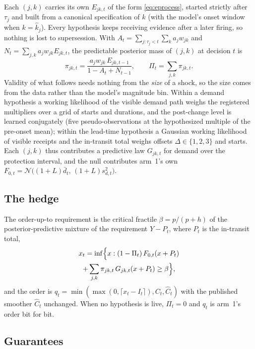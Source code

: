 Each $(j,k)$ carries its own \eprocess{} $E_{jk,t}$ of the form
\eqref{eq:eprocess}, started strictly after $\tau_j$ and built from a canonical
specification of $k$ (with the model's onset window when $k = \hat k_j$). Every
hypothesis keeps receiving evidence after a later firing, so nothing is lost to
supersession. With $A_t = \sum_{j:\tau_j < t}\sum_k a_j w_{jk}$ and
$N_t = \sum_{j,k} a_j w_{jk} E_{jk,t}$, the predictable posterior mass of $(j,k)$
at decision $t$ is
\begin{equation}
\pi_{jk,t} = \frac{a_j w_{jk}\, E_{jk,t-1}}{1 - A_t + N_{t-1}},
\qquad
\Pi_t = \sum_{j,k} \pi_{jk,t}.
\label{eq:posterior}
\end{equation}
Validity of what follows needs nothing from the \emph{size} of a shock, so the
size comes from the data rather than the model's magnitude bin. Within a demand
hypothesis a working likelihood of the visible demand path weighs the registered
multipliers over a grid of starts and durations, and the post-change level is
learned conjugately (five pseudo-observations at the hypothesized multiple of the
pre-onset mean); within the lead-time hypothesis a Gaussian working likelihood of
visible receipts and the in-transit total weighs offsets $\Delta \in \{1,2,3\}$
and starts. Each $(j,k)$ thus contributes a predictive law $G_{jk,t}$ for demand
over the protection interval, and the null contributes arm~1's own
$F_{0,t} = \mathcal{N}\bigl((1+L)\bar d_t,\,(1+L)s_{d,t}^2\bigr)$.

\subsection{The hedge}

The order-up-to requirement is the critical fractile $\beta = p/(p+h)$ of the
posterior-predictive mixture of the requirement $Y - P_t$, where $P_t$ is the
in-transit total,
\begin{multline}
x_t = \inf\Bigl\{x : (1-\Pi_t)\,F_{0,t}(x + P_t) \\
+ \sum_{j,k}\pi_{jk,t}\,G_{jk,t}(x + P_t) \ge \beta\Bigr\},
\label{eq:hedge}
\end{multline}
and the order is $q_t = \min(\max(0,\lceil x_t - I_t\rceil), C_t, \hat C_t)$ with
the published smoother $\hat C_t$ unchanged. When no hypothesis is live,
$\Pi_t = 0$ and $q_t$ is arm~1's order bit for bit.

\subsection{Guarantees}

